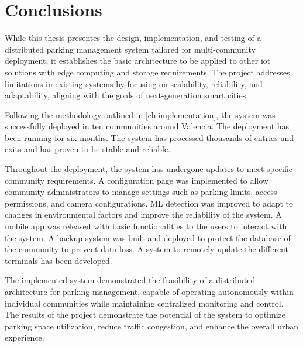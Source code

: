 \chapter{Conclusions}\label{ch:conclusions}

While this thesis presentes the design, implementation, and testing of a distributed parking management system tailored for multi-community deployment, it establishes the basic architecture to be applied to other \gls{iot} solutions with edge computing and storage requirements. The project addresses limitations in existing systems by focusing on scalability, reliability, and adaptability, aligning with the goals of next-generation smart cities. 

Following the methodology outlined in \cref{ch:implementation}, the system was successfully deployed in ten communities around Valencia. The deployment has been running for six months. The system has processed thousands of entries and exits and has proven to be stable and reliable. 

Throughout the deployment, the system has undergone updates to meet specific community requirements. A configuration page was implemented to allow community administrators to manage settings such as parking limits, access permissions, and camera configurations. ML detection was improved to adapt to changes in environmental factors and improve the reliability of the system. A mobile app was released with basic functionalities to the users to interact with the system. A backup system was built and deployed to protect the database of the community to prevent data loss. A system to remotely update the different terminals has been developed. 

The implemented system demonstrated the feasibility of a distributed architecture for parking management, capable of operating autonomously within individual communities while maintaining centralized monitoring and control. The results of the project demonstrate the potential of the system to optimize parking space utilization, reduce traffic congestion, and enhance the overall urban experience.
